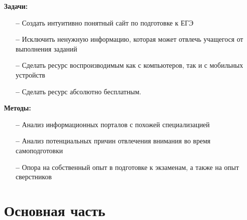 \documentclass[a4paper, 12pt]{extarticle}
\begin{document}
\vspace{2mm}
\textbf{Задачи:}
\begin{itemize}
    \item[\bfseries--] Создать интуитивно понятный сайт по подготовке к ЕГЭ
    \item[\bfseries--] Исключить ненужную информацию, которая может отвлечь
        учащегося от выполнения заданий
    \item[\bfseries--] Сделать ресурс воспроизводимым как с компьютеров, так и
        с мобильных устройств
    \item[\bfseries--] Сделать ресурс абсолютно бесплатным.
\end{itemize}

\vspace{2mm}
\textbf{Методы:}
\begin{itemize}
    \item[\bfseries--] Анализ информационных порталов с похожей специализацией
    \item[\bfseries--] Анализ потенциальных причин отвлечения внимания во время
        самоподготовки
    \item[\bfseries--] Опора на собственный опыт в подготовке к экзаменам, а
        также на опыт сверстников
\end{itemize}
\newpage

\section{Основная часть}
\end{document}
